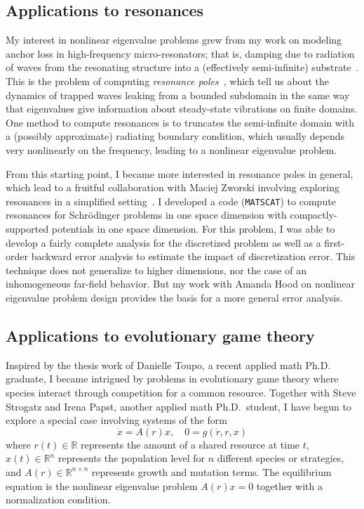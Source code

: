 \documentclass[11pt]{amsart}
\newcommand{\bbR}{\mathbb{R}}
\begin{document}
\subsection*{Applications to resonances}

My interest in nonlinear eigenvalue problems grew from my work on
modeling anchor loss in high-frequency micro-resonators; that is,
damping due to radiation of waves from the resonating structure into a
(effectively semi-infinite)
substrate~\cite{2004-para,2005-mems,2005-ijnme,2005-sensors}.
This is the problem of computing
{\em resonance poles}~\cite{Bindel:2006:ROD,Zworski:1999:RIP},
which tell us about
the dynamics of trapped waves leaking from a bounded
subdomain in the same way that eigenvalues give information about
steady-state vibrations on finite domains.
One method to compute resonances is to truncates the semi-infinite
domain with a (possibly approximate) radiating boundary condition, which
usually depends very nonlinearly on the frequency, leading to a nonlinear
eigenvalue problem.

From this starting point, I became more interested in resonance poles in
general, which lead to a fruitful collaboration with Maciej Zworski
involving exploring resonances in a simplified
setting~\cite{2007-symmetry}.
I developed a code ({\tt MATSCAT}) to compute resonances for
Schr{\"o}dinger problems in one space dimension with compactly-supported
potentials in one space dimension.  For this problem, I was able to
develop a fairly complete analysis for the discretized problem as well
as a first-order backward error analysis to estimate the impact of
discretization error.  This technique does not generalize to higher
dimensions, nor the case of an inhomogeneous far-field behavior.  But
my work with Amanda Hood on nonlinear eigenvalue problem design provides
the basis for a more general error analysis.

\subsection*{Applications to evolutionary game theory}

Inspired by the thesis work of Danielle Toupo, a recent applied math
Ph.D. graduate, I became intrigued by problems in
evolutionary game theory where species interact through competition for
a common resource.  Together with Steve Strogatz and Irena Papst,
another applied math Ph.D.~student, I have begun to explore a
special case involving systems of the form
\[
  \dot{x} = A(r) x, \quad  0 = g(\dot{r}, r, x)
\]
where $r(t) \in \bbR$ represents the amount of a shared resource at
time $t$, $x(t) \in \bbR^n$ represents the population level for $n$
different species or strategies, and $A(r) \in \bbR^{n \times n}$
represents growth and mutation terms.  The equilibrium equation is
the nonlinear eigenvalue problem $A(r) x = 0$ together with a
normalization condition.
\end{document}
